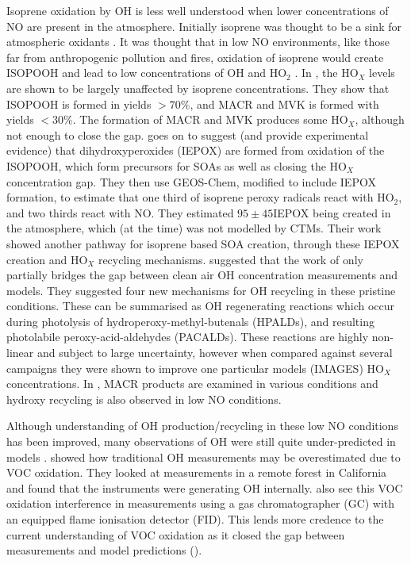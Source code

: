     Isoprene oxidation by OH is less well understood when lower concentrations of NO are present in the atmosphere.
    Initially isoprene was thought to be a sink for atmospheric oxidants \citep[e.g.][]{Guenther2000}.
    It was thought that in low NO environments, like those far from anthropogenic pollution and fires, oxidation of isoprene would create ISOPOOH and lead to low concentrations of OH and HO$_2$ \cite{Paulot2009b}.
    In \cite{Paulot2009b}, the HO$_X$ levels are shown to be largely unaffected by isoprene concentrations.
    They show that ISOPOOH is formed in yields $> 70\%$, and MACR and MVK is formed with yields $< 30\%$.
    The formation of MACR and MVK produces some HO$_X$, although not enough to close the gap.
    \cite{Paulot2009b} goes on to suggest (and provide experimental evidence) that dihydroxyperoxides (IEPOX) are formed from oxidation of the ISOPOOH, which form precursors for SOAs as well as closing the HO$_X$ concentration gap.
    They then use GEOS-Chem, modified to include IEPOX formation, to estimate that one third of isoprene peroxy radicals react with HO$_2$, and two thirds react with NO. 
    They estimated $95 \pm 45$\tgpyr IEPOX being created in the atmosphere, which (at the time) was not modelled by CTMs.
    Their work showed another pathway for isoprene based SOA creation, through these IEPOX creation and HO$_X$ recycling mechanisms.
    \cite{Peeters2010} suggested that the work of \cite{Paulot2009b} only partially bridges the gap between clean air OH concentration measurements and models.
    They suggested four new mechanisms for OH recycling in these pristine conditions.
    These can be summarised as OH regenerating reactions which occur during photolysis of hydroperoxy-methyl-butenals (HPALDs), and resulting photolabile peroxy-acid-aldehydes (PACALDs).
    These reactions are highly non-linear and subject to large uncertainty, however when compared against several campaigns they were shown to improve one particular models (IMAGES) HO$_X$ concentrations.
    In \cite{Crounse2012}, MACR products are examined in various conditions and hydroxy recycling is also observed in low NO conditions.
    
    Although understanding of OH production/recycling in these low NO conditions has been improved, many observations of OH were still quite under-predicted in models \citep{Mao2012}.
    \cite{Mao2012} showed how traditional OH measurements may be overestimated due to VOC oxidation.
    They looked at measurements in a remote forest in California and found that the instruments were generating OH internally.
    \cite{Nguyen2014} also see this VOC oxidation interference in measurements using a gas chromatographer (GC) with an equipped flame ionisation detector (FID).
    This lends more credence to the current understanding of VOC oxidation as it closed the gap between measurements and model predictions (\cite{Mao2012}).
    

